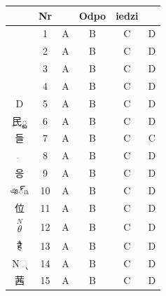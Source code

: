 \documentclass[10pt]{article}
\begin{document}
\begin{center}
\begin{tabular}{|c|c|c|c|c|c|}
\hline
 & Nr &  & Odpo & iedzi &  \\
\hline
 & 1 & A & B & C & D \\
\hline
 & 2 & A & B & C & D \\
\hline
 & 3 & A & B & C & D \\
\hline
 & 4 & A & B & C & D \\
\hline
D & 5 & A & B & C & D \\
\hline
民్ట & 6 & A & B & C & D \\
\hline
들 & 7 & A & B & C & C \\
\hline
\( \ddot{~} \) & 8 & A & B & C & D \\
\hline
응 & 9 & A & B & C & D \\
\hline
ঞ్a & 10 & A & B & C & D \\
\hline
位 & 11 & A & B & C & D \\
\hline
\( \stackrel{N}{\theta} \) & 12 & A & B & C & D \\
\hline
है & 13 & A & B & C & D \\
\hline
N્ & 14 & A & B & C & D \\
\hline
茜 & 15 & A & B & C & D \\
\hline

\end{tabular}
\end{center}
\end{document}
